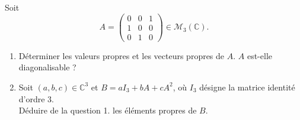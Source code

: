 \documentclass[a4paper,12pt,oneside]{book}
\newenvironment{statement}{\begin{statementbox}}{\end{statementbox}}
\begin{document}
	\begin{statement}
		Soit 
		\[
		A = \begin{pmatrix}
			0 & 0 & 1 \\
			1 & 0 & 0 \\
			0 & 1 & 0
		\end{pmatrix} \in \mathcal{M}_3(\mathbb{C}).
		\]
		\begin{enumerate}
			\item Déterminer les valeurs propres et les vecteurs propres de \(A\). \(A\) est-elle diagonalisable ?
			\item Soit \((a, b, c) \in \mathbb{C}^3\) et \(B = aI_3 + bA + cA^2\), où \(I_3\) désigne la matrice identité d’ordre 3.\\
			Déduire de la question 1. les éléments propres de \(B\).
		\end{enumerate}
	\end{statement}
	
\end{document}
